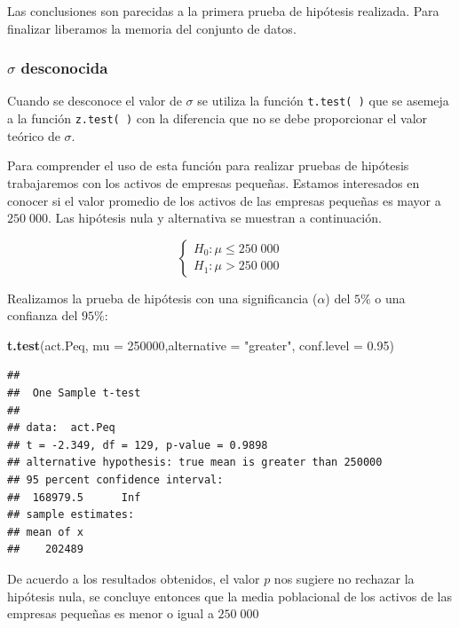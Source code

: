 \documentclass[
]{krantz}
\makeatletter
\newenvironment{Shaded}{\begin{snugshade}}{\end{snugshade}}
\newcommand{\DataTypeTok}[1]{\textcolor[rgb]{0.27,0.27,0.27}{#1}}
\newcommand{\DecValTok}[1]{\textcolor[rgb]{0.06,0.06,0.06}{#1}}
\newcommand{\FloatTok}[1]{\textcolor[rgb]{0.06,0.06,0.06}{#1}}
\newcommand{\KeywordTok}[1]{\textcolor[rgb]{0.27,0.27,0.27}{\textbf{#1}}}
\newcommand{\NormalTok}[1]{#1}
\newcommand{\StringTok}[1]{\textcolor[rgb]{0.5,0.5,0.5}{#1}}
\newenvironment{kframe}{%
\medskip{}
\setlength{\fboxsep}{.8em}
 \def\at@end@of@kframe{}%
 \ifinner\ifhmode%
  \def\at@end@of@kframe{\end{minipage}}%
  \begin{minipage}{\columnwidth}%
 \fi\fi%
 \def\FrameCommand##1{\hskip\@totalleftmargin \hskip-\fboxsep
 \colorbox{shadecolor}{##1}\hskip-\fboxsep
     \hskip-\linewidth \hskip-\@totalleftmargin \hskip\columnwidth}%
 \MakeFramed {\advance\hsize-\width
   \@totalleftmargin\z@ \linewidth\hsize
   \@setminipage}}%
 {\par\unskip\endMakeFramed%
 \at@end@of@kframe}
\renewenvironment{Shaded}{\begin{kframe}}{\end{kframe}}
\makeatother
\begin{document}
Las conclusiones son parecidas a la primera prueba de hipótesis realizada. Para finalizar liberamos la memoria del conjunto de datos.

\hypertarget{sigma-desconocida}{%
\subsubsection{\texorpdfstring{\(\sigma\) desconocida}{\textbackslash{}sigma desconocida}}\label{sigma-desconocida}}

Cuando se desconoce el valor de \(\sigma\) se utiliza la función \texttt{t.test(\ )} que se asemeja a la función \texttt{z.test(\ )} con la diferencia que no se debe proporcionar el valor teórico de \(\sigma\).

Para comprender el uso de esta función para realizar pruebas de hipótesis trabajaremos con los activos de empresas pequeñas. Estamos interesados en conocer si el valor promedio de los activos de las empresas pequeñas es mayor a \(250\;000\). Las hipótesis nula y alternativa se muestran a continuación.

\begin{equation} 
\begin{cases} 
H_0: \mu \leq 250\;000 \\ 
H_1: \mu > 250\;000
\end{cases} 
\end{equation}

Realizamos la prueba de hipótesis con una significancia (\(\alpha\)) del \(5\%\) o una confianza del \(95\%\):

\begin{Shaded}
\begin{Highlighting}[]
\KeywordTok{t.test}\NormalTok{(act.Peq, }\DataTypeTok{mu =} \DecValTok{250000}\NormalTok{,}\DataTypeTok{alternative =} \StringTok{"greater"}\NormalTok{,  }\DataTypeTok{conf.level =} \FloatTok{0.95}\NormalTok{)}
\end{Highlighting}
\end{Shaded}

\begin{verbatim}
## 
##  One Sample t-test
## 
## data:  act.Peq
## t = -2.349, df = 129, p-value = 0.9898
## alternative hypothesis: true mean is greater than 250000
## 95 percent confidence interval:
##  168979.5      Inf
## sample estimates:
## mean of x 
##    202489
\end{verbatim}

De acuerdo a los resultados obtenidos, el valor \(p\) nos sugiere no rechazar la hipótesis nula, se concluye entonces que la media poblacional de los activos de las empresas pequeñas es menor o igual a \(250\;000\)
\end{document}
